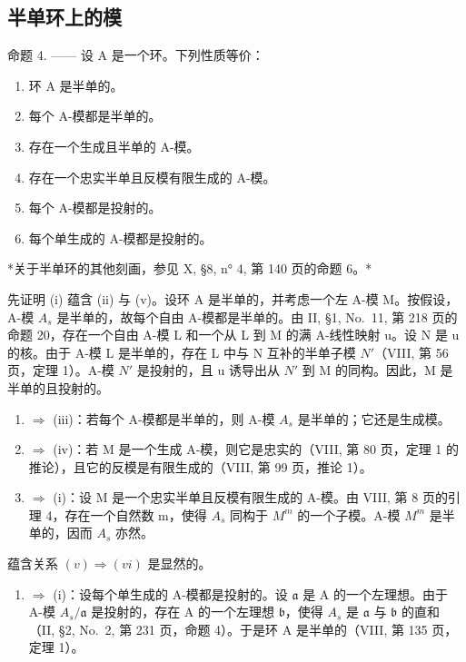 \subsection{半单环上的模}

命题 4. —— 设 A 是一个环。下列性质等价：

\begin{enumerate}
\def\labelenumi{(\roman{enumi})}
\item
  环 A 是半单的。
\item
  每个 A-模都是半单的。
\item
  存在一个生成且半单的 A-模。
\item
  存在一个忠实半单且反模有限生成的 A-模。
\item
  每个 A-模都是投射的。
\item
  每个单生成的 A-模都是投射的。
\end{enumerate}

*关于半单环的其他刻画，参见 X, §8, n° 4, 第 140 页的命题 6。*

先证明 (i) 蕴含 (ii) 与 (v)。设环 A 是半单的，并考虑一个左 A-模 M。按假设，A-模 \(A_{s}\) 是半单的，故每个自由 A-模都是半单的。由 II, §1, No.~11, 第 218 页的命题 20，存在一个自由 A-模 L 和一个从 L 到 M 的满 A-线性映射 u。设 N 是 u 的核。由于 A-模 L 是半单的，存在 L 中与 N 互补的半单子模 \(N'\)（VIII, 第 56 页，定理 1）。A-模 \(N'\) 是投射的，且 u 诱导出从 \(N'\) 到 M 的同构。因此，M 是半单的且投射的。

\begin{enumerate}
\def\labelenumi{(\roman{enumi})}
\setcounter{enumi}{1}
\item
  \(\Rightarrow\) (iii)：若每个 A-模都是半单的，则 A-模 \(A_{s}\) 是半单的；它还是生成模。
\item
  \(\Rightarrow\) (iv)：若 M 是一个生成 A-模，则它是忠实的（VIII, 第 80 页，定理 1 的推论），且它的反模是有限生成的（VIII, 第 99 页，推论 1）。
\item
  \(\Rightarrow\) (i)：设 M 是一个忠实半单且反模有限生成的 A-模。由 VIII, 第 8 页的引理 4，存在一个自然数 m，使得 \(A_{s}\) 同构于 \(M^{m}\) 的一个子模。A-模 \(M^{m}\) 是半单的，因而 \(A_{s}\) 亦然。
\end{enumerate}

蕴含关系 \((v) \Rightarrow (vi)\) 是显然的。

\begin{enumerate}
\def\labelenumi{(\roman{enumi})}
\setcounter{enumi}{5}
\tightlist
\item
  \(\Rightarrow\) (i)：设每个单生成的 A-模都是投射的。设 \(\mathfrak{a}\) 是 A 的一个左理想。由于 A-模 \(A_s / \mathfrak{a}\) 是投射的，存在 A 的一个左理想 \(\mathfrak{b}\)，使得 \(A_s\) 是 \(\mathfrak{a}\) 与 \(\mathfrak{b}\) 的直和（II, §2, No.~2, 第 231 页，命题 4）。于是环 A 是半单的（VIII, 第 135 页，定理 1）。
\end{enumerate}

